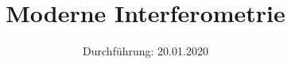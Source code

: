 
\subject{V64}
\title{Moderne Interferometrie}
\date{%
  Durchführung: 20.01.2020
}



  \maketitle
  \thispagestyle{empty}
  \tableofcontents

  \newpage
  

  
  \newpage
  

  
  \printbibliography{}
  \newpage
  
  \FloatBarrier
  


